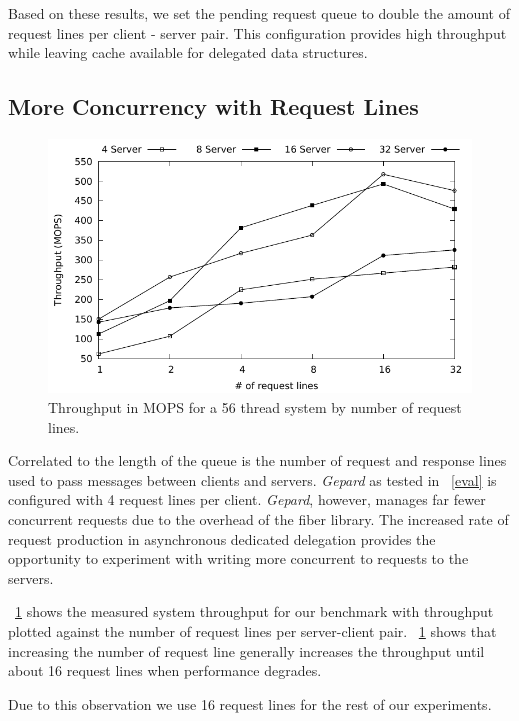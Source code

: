 \documentclass{uicthesi}
\begin{document}
Based on these results, we set the pending request queue to double the amount of request lines per client - server pair. This configuration provides high throughput while leaving cache available for delegated data structures. 

\subsection{More Concurrency with Request Lines}

\begin{figure}[ht!]
\centering
\includegraphics[width=0.9\columnwidth]{FIG/thput_by_rl.pdf}
\caption{Throughput in MOPS for a 56 thread system by number of request lines. }
\label{fig:dedicated_thput_by_rl}
\end{figure}

Correlated to the length of the queue is the number of request and response lines used to pass messages between clients and servers. \textit{Gepard} as tested in ~\autoref{eval} is configured with 4 request lines per client. \textit{Gepard}, however, manages far fewer concurrent requests due to the overhead of the fiber library. The increased rate of request production in asynchronous dedicated delegation provides the opportunity to experiment with writing more concurrent to requests to the servers. 

~\ref{fig:dedicated_thput_by_rl} shows the measured system throughput for our benchmark with throughput plotted against the number of request lines per server-client pair. ~\ref{fig:dedicated_thput_by_rl} shows that increasing the number of request line generally increases the throughput until about 16 request lines when performance degrades. 

Due to this observation we use 16 request lines for the rest of our experiments. 
\end{document}
